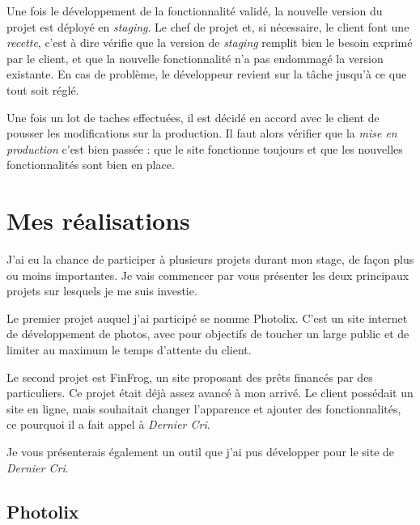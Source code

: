 \documentclass[12pt,a4paper]{article}
\begin{document}
  \bigskip

  Une fois le développement de la fonctionnalité validé, la nouvelle
  version du projet est déployé en \emph{staging}. Le chef de projet et,
  si nécessaire, le client font une \emph{recette}, c'est à dire vérifie
  que la version de \emph{staging} remplit bien le besoin exprimé par le
  client, et que la nouvelle fonctionnalité n'a pas endommagé la version
  existante. En cas de problème, le développeur revient sur la tâche
  jusqu'à ce que tout soit réglé.

  \bigskip

  Une fois un lot de taches effectuées, il est décidé en accord avec le
  client de pousser les modifications sur la production. Il faut alors
  vérifier que la \emph{mise en production} c'est bien passée : que le
  site fonctionne toujours et que les nouvelles fonctionnalités sont bien
  en place.

  \newpage

  \section{Mes réalisations}\label{mes-ruxe9alisations}

  \bigskip

  J'ai eu la chance de participer à plusieurs projets durant mon stage, de
  façon plus ou moins importantes. Je vais commencer par vous présenter
  les deux principaux projets sur lesquels je me suis investie.

  \bigskip

  Le premier projet auquel j'ai participé se nomme Photolix. C'est un site
  internet de développement de photos, avec pour objectifs de toucher un
  large public et de limiter au maximum le temps d'attente du client.

  \bigskip

  Le second projet est FinFrog, un site proposant des prêts financés par
  des particuliers. Ce projet était déjà assez avancé à mon arrivé. Le
  client possédait un site en ligne, mais souhaitait changer l'apparence
  et ajouter des fonctionnalités, ce pourquoi il a fait appel à
  \emph{Dernier Cri}.

  \bigskip

  Je vous présenterais également un outil que j'ai pus développer pour le
  site de \emph{Dernier Cri}.

  \bigskip

  \subsection{Photolix}\label{photolix}
\end{document}

